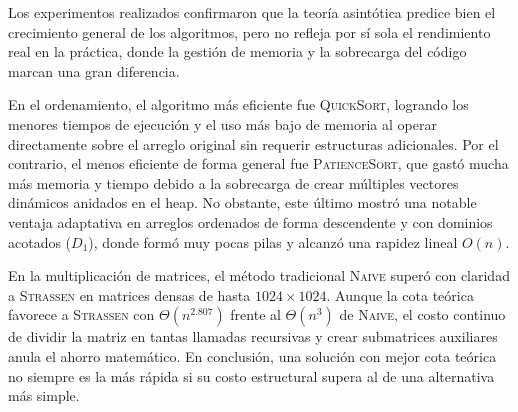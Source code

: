 Los experimentos realizados confirmaron que la teoría asintótica predice bien el crecimiento general de los algoritmos, pero no refleja por sí sola el rendimiento real en la práctica, donde la gestión de memoria y la sobrecarga del código marcan una gran diferencia.

En el ordenamiento, el algoritmo más eficiente fue \textsc{QuickSort}, logrando los menores tiempos de ejecución y el uso más bajo de memoria al operar directamente sobre el arreglo original sin requerir estructuras adicionales. Por el contrario, el menos eficiente de forma general fue \textsc{PatienceSort}, que gastó mucha más memoria y tiempo debido a la sobrecarga de crear múltiples vectores dinámicos anidados en el heap. No obstante, este último mostró una notable ventaja adaptativa en arreglos ordenados de forma descendente y con dominios acotados ($D_1$), donde formó muy pocas pilas y alcanzó una rapidez lineal $O(n)$.

En la multiplicación de matrices, el método tradicional \textsc{Naive} superó con claridad a \textsc{Strassen} en matrices densas de hasta $1024 \times 1024$. Aunque la cota teórica favorece a \textsc{Strassen} con $\Theta(n^{2.807})$ frente al $\Theta(n^3)$ de \textsc{Naive}, el costo continuo de dividir la matriz en tantas llamadas recursivas y crear submatrices auxiliares anula el ahorro matemático. En conclusión, una solución con mejor cota teórica no siempre es la más rápida si su costo estructural supera al de una alternativa más simple.